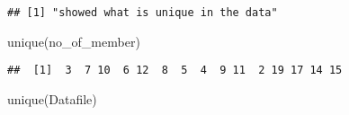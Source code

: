 \documentclass[
]{article}
\newenvironment{Shaded}{\begin{snugshade}}{\end{snugshade}}
\newcommand{\FunctionTok}[1]{\textcolor[rgb]{0.00,0.00,0.00}{#1}}
\newcommand{\NormalTok}[1]{#1}
\newcommand{\OtherTok}[1]{\textcolor[rgb]{0.56,0.35,0.01}{#1}}
\newcommand{\SpecialCharTok}[1]{\textcolor[rgb]{0.00,0.00,0.00}{#1}}
\newcommand{\StringTok}[1]{\textcolor[rgb]{0.31,0.60,0.02}{#1}}
\begin{document}
\begin{Shaded}
\end{Shaded}

\begin{verbatim}
## [1] "showed what is unique in the data"
\end{verbatim}

\begin{Shaded}
\begin{Highlighting}[]
\FunctionTok{unique}\NormalTok{(no\_of\_member)}
\end{Highlighting}
\end{Shaded}

\begin{verbatim}
##  [1]  3  7 10  6 12  8  5  4  9 11  2 19 17 14 15
\end{verbatim}

\begin{Shaded}
\begin{Highlighting}[]
\FunctionTok{unique}\NormalTok{(Datafile)}
\end{Highlighting}
\end{Shaded}
\end{document}
